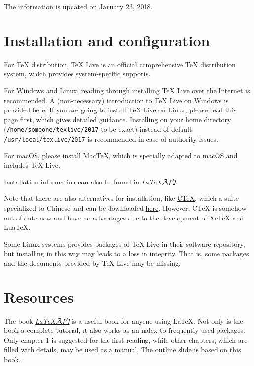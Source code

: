 \documentclass[english]{../TeXTemplate/pkupaper}
\title{\titlemark}
\author{pppppass}
\date{January 23, 2018}
\begin{document}
\maketitle

The information is updated on January 23, 2018.
 
\section{Installation and configuration}

For \TeX{} distribution, \href{http://www.tug.org/texlive/}{\TeX{} Live} is an official comprehensive TeX distribution system, which provides system-specific supports.

For Windows and Linux, reading through \href{http://www.tug.org/texlive/acquire-netinstall.html}{installing \TeX{} Live over the Internet} is recommended. A (non-necessary) introduction to \TeX{} Live on Windows is provided \href{http://www.tug.org/texlive/windows.html}{here}. If you are going to install \TeX{} Live on Linux, please read \href{http://www.tug.org/texlive/quickinstall.html}{this page} first, which gives detailed guidance. Installing on your home directory (\verb"/home/someone/texlive/2017" to be exact) instead of default \verb"/usr/local/texlive/2017" is recommended in case of authority issues.

For macOS, please install \href{http://www.tug.org/mactex/}{MacTeX}, which is specially adapted to macOS and includes \TeX{} Live.

Installation information can also be found in \emph{\LaTeX 入门}.

Note that there are also alternatives for installation, like \href{http://www.ctex.org/CTeX}{CTeX}, which a suite specialized to Chinese and can be downloaded \href{http://www.ctex.org/CTeXDownload}{here}. However, CTeX is somehow out-of-date now and have no advantages due to the development of XeTeX and LuaTeX.

Some Linux systems provides packages of \TeX{} Live in their software repository, but installing in this way may leads to a loss in integrity. That is, some packages and the documents provided by \TeX{} Live may be missing.

\section{Resources}

The book \href{https://item.jd.com/11258469.html}{\emph{\LaTeX 入门}} is a useful book for anyone using \LaTeX. Not only is the book a complete tutorial, it also works as an index to frequently used packages. Only chapter 1 is suggested for the first reading, while other chapters, which are filled with details, may be used as a manual. The outline slide is based on this book.
\end{document}
